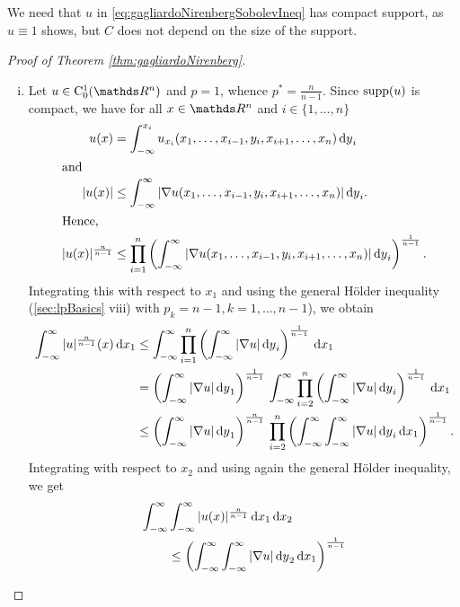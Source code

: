 \begin{rem}
  We need that $u$ in \eqref{eq:gagliardoNirenbergSobolevIneq} has compact support, as $u \equiv 1$ shows, but $C$ does not depend on the size of the support.
\end{rem}

\begin{proof}[Proof of Theorem \ref{thm:gagliardoNirenberg}]
  \begin{enumerate}[i)]
    \item Let $u \in \CC_0^1(\R^n)$ and $p = 1$, whence $p^* = \frac{n}{n - 1}$.
      Since $\operatorname{supp}(u)$ is compact, we have for all $x \in \R^n$ and $i \in \{1,\dots,n\}$
      \begin{align*}
        u(x) &= \int_{-\infty}^{x_i} u_{x_i}(x_1,\dots,x_{i - 1}, y_i, x_{i + 1}, \dots, x_n) \, {\operatorname{d}\!{y}}_i \\
        \intertext{and}
        |u(x)| &\leq \int_{-\infty}^\infty |\nabla u(x_1,\dots,x_{i - 1}, y_i, x_{i + 1}, \dots,x_n)| \, {\operatorname{d}\!{y}}_i. \\
        \intertext{Hence,}
        |u(x)|^{\frac{n}{n - 1}} &\leq \prod_{i = 1}^n \left( \int_{-\infty}^\infty |\nabla u(x_1,\dots,x_{i - 1}, y_i, x_{i + 1}, \dots, x_n) | \, {\operatorname{d}\!{y}}_i \right)^{\frac{1}{n - 1}}.
      \end{align*}
      Integrating this with respect to $x_1$ and using the general Hölder inequality (\ref{sec:lpBasics} viii) with $p_k = n - 1, k = 1,\dots,n - 1$), we obtain
      \begin{align*}
        \int_{-\infty}^\infty |u|^{\frac{n}{n - 1}}(x) \d x_1
        &\leq \int_{-\infty}^\infty \prod_{i = 1}^n \left( \int_{-\infty}^\infty |\nabla u| \d y_i \right)^{\frac{1}{n - 1}} \d x_1 \\
        &= \left( \int_{-\infty}^\infty |\nabla u| \d y_1 \right)^{\frac{1}{n - 1}} \, \int_{-\infty}^\infty \prod_{i = 2}^n \left( \int_{-\infty}^\infty |\nabla u| \d y_i \right)^{\frac{1}{n - 1}} \d x_1 \\
        &\leq \left( \int_{-\infty}^\infty |\nabla u| \d y_1 \right)^{\frac{n}{n - 1}} \, \prod_{i = 2}^n \left( \int_{-\infty}^\infty \int_{-\infty}^\infty |\nabla u| \d y_i \d x_1 \right)^{\frac{1}{n - 1}}.
      \end{align*}
      Integrating with respect to $x_2$ and using again the general Hölder inequality, we get
      \begin{align*}
        \int_{-\infty}^\infty &\int_{-\infty}^\infty |u(x)|^{\frac{n}{n - 1}} \d x_1 \d x_2 \\
        &\leq \left( \int_{-\infty}^\infty \int_{-\infty}^\infty |\nabla u| \d y_2 \d x_1 \right)^{\frac{1}{n - 1}} \\

\end{align*}
\end{enumerate}
\end{proof}

